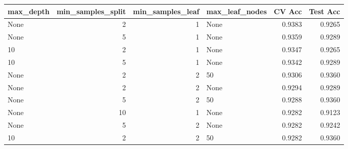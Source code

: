 \begin{tabular}{lrrlrr}
\toprule
max\_depth & min\_samples\_split & min\_samples\_leaf & max\_leaf\_nodes & CV Acc & Test Acc \\
\midrule
None & 2 & 1 & None & 0.9383 & 0.9265 \\
None & 5 & 1 & None & 0.9359 & 0.9289 \\
10 & 2 & 1 & None & 0.9347 & 0.9265 \\
10 & 5 & 1 & None & 0.9342 & 0.9289 \\
None & 2 & 2 & 50 & 0.9306 & 0.9360 \\
None & 2 & 2 & None & 0.9294 & 0.9289 \\
None & 5 & 2 & 50 & 0.9288 & 0.9360 \\
None & 10 & 1 & None & 0.9282 & 0.9123 \\
None & 5 & 2 & None & 0.9282 & 0.9242 \\
10 & 2 & 2 & 50 & 0.9282 & 0.9360 \\
\bottomrule
\end{tabular}
